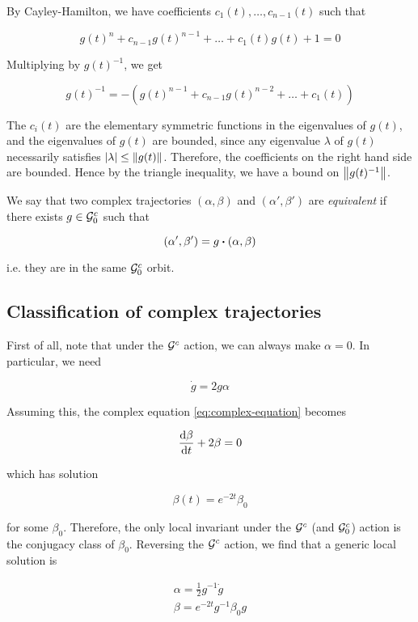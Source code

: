 \documentclass{article}
\begin{document}
By Cayley-Hamilton, we have coefficients \(c_1(t), \dots, c_{n-1}(t)\) such that

\[g(t)^n + c_{n-1}g(t)^{n-1} + \dots + c_1(t)g(t) + 1 = 0\]

Multiplying by \(g(t)^{-1}\), we get

\[g(t)^{-1} = -\left(g(t)^{n-1} + c_{n-1}g(t)^{n-2} + \dots + c_1(t)\right)\]

The \(c_i(t)\) are the elementary symmetric functions in the eigenvalues of \(g(t)\), and the eigenvalues of \(g(t)\) are bounded, since any eigenvalue \(\lambda\) of \(g(t)\) necessarily satisfies \(\abs{\lambda} \le \norm{g(t)}\). Therefore, the coefficients on the right hand side are bounded. Hence by the triangle inequality, we have a bound on \(\norm{g(t)^{-1}}\).

\begin{definition}
    [equivalent] We say that two complex trajectories \((\alpha, \beta)\) and \((\alpha', \beta')\) are \emph{equivalent} if there exists \(g \in \mathcal{G}^c_0\) such that

    \[(\alpha', \beta') = g \vdot (\alpha, \beta)\]

    i.e. they are in the same \(\mathcal{G}_0^c\) orbit.
\end{definition}

\subsection{Classification of complex trajectories}

First of all, note that under the \(\mathcal{G}^c\) action, we can always make \(\alpha = 0\). In particular, we need

\[\dot g = 2g\alpha\]

Assuming this, the complex equation \cref{eq:complex-equation} becomes

\[\dv{\beta}{t} + 2\beta = 0\]

which has solution

\[\beta(t) = e^{-2t}\beta_0\]

for some \(\beta_0\). Therefore, the only local invariant under the \(\mathcal{G}^c\) (and \(\mathcal{G}^c_0\)) action is the conjugacy class of \(\beta_0\). Reversing the \(\mathcal{G}^c\) action, we find that a generic local solution is

\begin{align*}
    \alpha = \frac{1}{2}g^{-1}\dot g \\
    \beta = e^{-2t}g^{-1}\beta_0g
\end{align*}
\end{document}
